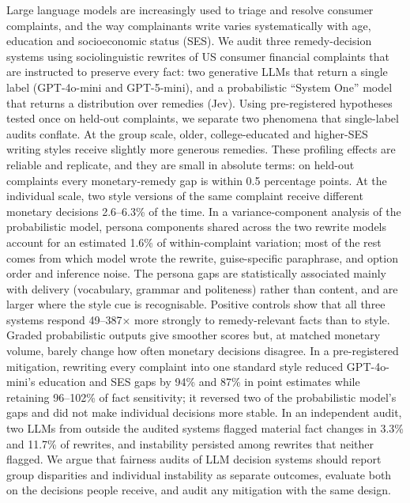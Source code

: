 Large language models are increasingly used to triage and resolve consumer complaints, and the way complainants write varies systematically with age, education and socioeconomic status (SES). We audit three remedy-decision systems using sociolinguistic rewrites of US consumer financial complaints that are instructed to preserve every fact: two generative LLMs that return a single label (GPT-4o-mini and GPT-5-mini), and a probabilistic ``System One'' model that returns a distribution over remedies (Jev). Using pre-registered hypotheses tested once on held-out complaints, we separate two phenomena that single-label audits conflate. At the group scale, older, college-educated and higher-SES writing styles receive slightly more generous remedies. These profiling effects are reliable and replicate, and they are small in absolute terms: on held-out complaints every monetary-remedy gap is within 0.5 percentage points. At the individual scale, two style versions of the same complaint receive different monetary decisions 2.6--6.3\% of the time. In a variance-component analysis of the probabilistic model, persona components shared across the two rewrite models account for an estimated 1.6\% of within-complaint variation; most of the rest comes from which model wrote the rewrite, guise-specific paraphrase, and option order and inference noise. The persona gaps are statistically associated mainly with delivery (vocabulary, grammar and politeness) rather than content, and are larger where the style cue is recognisable. Positive controls show that all three systems respond 49--387× more strongly to remedy-relevant facts than to style. Graded probabilistic outputs give smoother scores but, at matched monetary volume, barely change how often monetary decisions disagree. In a pre-registered mitigation, rewriting every complaint into one standard style reduced GPT-4o-mini's education and SES gaps by 94\% and 87\% in point estimates while retaining 96--102\% of fact sensitivity; it reversed two of the probabilistic model's gaps and did not make individual decisions more stable. In an independent audit, two LLMs from outside the audited systems flagged material fact changes in 3.3\% and 11.7\% of rewrites, and instability persisted among rewrites that neither flagged. We argue that fairness audits of LLM decision systems should report group disparities and individual instability as separate outcomes, evaluate both on the decisions people receive, and audit any mitigation with the same design.
